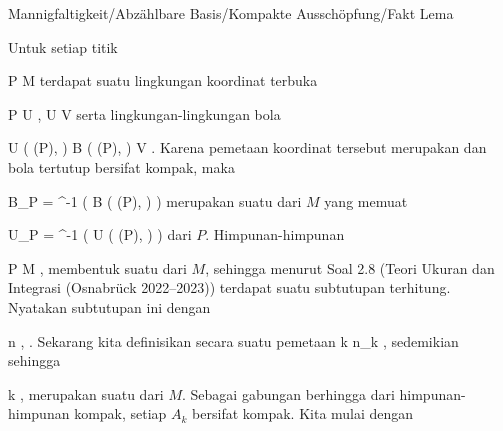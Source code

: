 {Mannigfaltigkeit/Abzählbare Basis/Kompakte Ausschöpfung/Fakt}
{Lema}
{}
{

\faktzusatz {}
\faktzusatz {}

}
{

Untuk setiap titik

\mavergleichskette
{\vergleichskette
{ P
}
{ \in }{ M
}
{  }{
}
{    }{
}
{   }{
}
}
{}{}{}
terdapat suatu lingkungan koordinat terbuka

\mavergleichskette
{\vergleichskette
{ P
}
{ \in }{ U
}
{  }{
}
{    }{
}
{   }{
}
}
{}{}{,}
\maabbdisp {\alpha} { U } { V
} {}
serta lingkungan-lingkungan bola

\mavergleichskettedisp
{\vergleichskette
{ U \left(  \alpha(P), \epsilon  \right)
}
{ \subseteq} { B  \left( \alpha(P), \epsilon \right)
}
{ \subset} { V
}
{ } {
}
{ } {
}
}
{}{}{.}
Karena pemetaan koordinat tersebut merupakan
dan bola tertutup bersifat kompak, maka

\mavergleichskette
{\vergleichskette
{ B_P
}
{ = }{ \alpha^{-1} \left(  B  \left( \alpha(P), \epsilon \right)  \right)
}
{  }{
}
{    }{
}
{   }{
}
}
{}{}{}
merupakan suatu
dari $M$ yang memuat

\mavergleichskette
{\vergleichskette
{ U_P
}
{ = }{ \alpha^{-1} \left(  U \left(  \alpha(P), \epsilon  \right)  \right)
}
{  }{
}
{    }{
}
{   }{
}
}
{}{}{}
dari $P$. Himpunan-himpunan

 {}
 {P \in M} {}
 {} {} {} {,}
membentuk suatu
dari $M$, sehingga menurut
Soal 2.8 (Teori Ukuran dan Integrasi (Osnabrück 2022--2023))
terdapat suatu subtutupan terhitung. Nyatakan subtutupan ini dengan

 {}
 {n \in \N} {}
 {} {} {} {,}
 {} {.}
Sekarang kita definisikan secara
suatu pemetaan
\maabbeledisp {} {\N} {\N
} { k } {n_k
} {,}
sedemikian sehingga

 {}
 {k \in \N} {}
 {} {} {} {,}
merupakan suatu
dari $M$. Sebagai gabungan berhingga dari himpunan-himpunan kompak, setiap $A_k$ bersifat kompak. Kita mulai dengan

}
